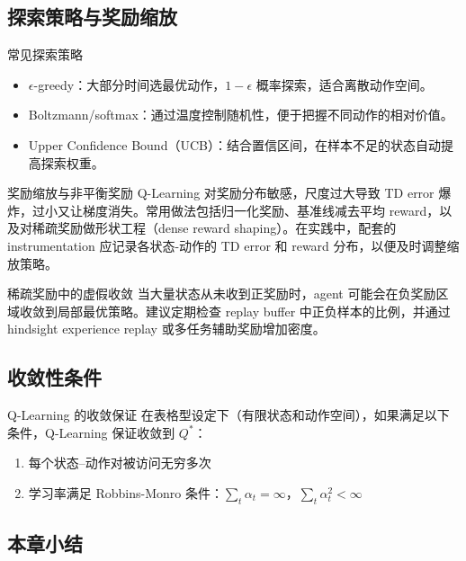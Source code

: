 \documentclass[a4paper]{article}
\begin{document}
\subsection{探索策略与奖励缩放}

\begin{knowledgebox}{常见探索策略}
\begin{itemize}
    \item $\epsilon$-greedy：大部分时间选最优动作，$1-\epsilon$ 概率探索，适合离散动作空间。
    \item Boltzmann/softmax：通过温度控制随机性，便于把握不同动作的相对价值。
    \item Upper Confidence Bound（UCB）：结合置信区间，在样本不足的状态自动提高探索权重。
\end{itemize}
\end{knowledgebox}

\begin{importantbox}{奖励缩放与非平衡奖励}
Q-Learning 对奖励分布敏感，尺度过大导致 TD error 爆炸，过小又让梯度消失。常用做法包括归一化奖励、基准线减去平均 reward，以及对稀疏奖励做形状工程（dense reward shaping）。在实践中，配套的 instrumentation 应记录各状态-动作的 TD error 和 reward 分布，以便及时调整缩放策略。
\end{importantbox}

\begin{warningbox}{稀疏奖励中的虚假收敛}
当大量状态从未收到正奖励时，agent 可能会在负奖励区域收敛到局部最优策略。建议定期检查 replay buffer 中正负样本的比例，并通过 hindsight experience replay 或多任务辅助奖励增加密度。
\end{warningbox}

\subsection{收敛性条件}

\begin{importantbox}{Q-Learning 的收敛保证}
在表格型设定下（有限状态和动作空间），如果满足以下条件，Q-Learning 保证收敛到 $Q^*$：
\begin{enumerate}
    \item 每个状态--动作对被访问无穷多次
    \item 学习率满足 Robbins-Monro 条件：$\sum_t \alpha_t = \infty$，$\sum_t \alpha_t^2 < \infty$
\end{enumerate}
\end{importantbox}

\subsection{本章小结}
\end{document}
